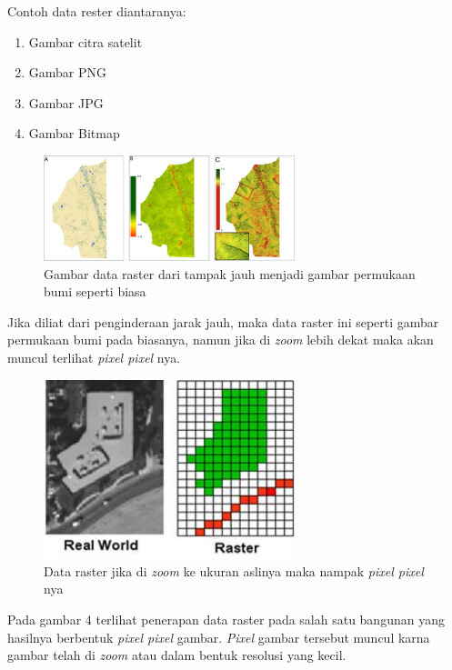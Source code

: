 Contoh data rester diantaranya:
\begin{enumerate}
\item Gambar citra satelit
\item Gambar PNG
\item Gambar JPG
\item Gambar Bitmap
\end{enumerate}
		\begin{figure}[htbp]
		\centering
		\includegraphics[width=0.65\textwidth]{pictures/dataraster.jpg}
		\caption{Gambar data raster dari tampak jauh menjadi gambar permukaan bumi seperti biasa}
		\label{labelgambar4}
		\end{figure}
Jika diliat dari penginderaan jarak jauh, maka data raster ini seperti gambar permukaan bumi pada biasanya, namun jika di \textit{zoom} lebih dekat maka akan muncul terlihat \textit{pixel pixel} nya.
		\begin{figure}[htbp]
		\centering
		\includegraphics[width=0.65\textwidth]{pictures/datarasterzoom.jpg}
		\caption{Data raster jika di \textit{zoom} ke ukuran aslinya maka nampak \textit{pixel pixel} nya}
		\label{labelgambar5}
		\end{figure}
Pada gambar 4 terlihat penerapan data raster pada salah satu bangunan yang hasilnya berbentuk \textit{pixel pixel} gambar. \textit{Pixel} gambar tersebut muncul karna gambar telah di \textit{zoom} atau dalam bentuk resolusi yang kecil.

